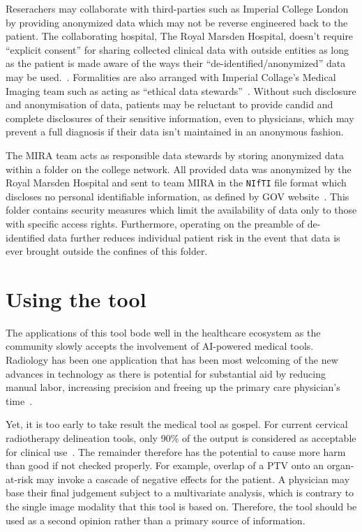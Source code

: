 \documentclass[12pt,twoside]{report}
\begin{document}
Reserachers may collaborate with third-parties such as Imperial College London by providing anonymized data which may not be reverse engineered back to the patient. The collaborating hospital, The Royal Marsden Hospital, doesn't require ``explicit consent'' for sharing collected clinical data with outside entities as long as the patient is made aware of the ways their ``de-identified/anonymized'' data may be used.~\cite{royal-marsden-privacy-note}. Formalities are also arranged with Imperial Collage's Medical Imaging team such as acting as ``ethical data stewards''~\cite{Larson2020-ib}. Without such disclosure and anonymisation of data, patients may be reluctant to provide candid and complete disclosures of their sensitive information, even to physicians, which may prevent a full diagnosis if their data isn't maintained in an anonymous fashion.

The MIRA team acts as responsible data stewards by storing anonymized data within a folder on the college network. All provided data was anonymized by the Royal Marsden Hospital and sent to team MIRA in the \texttt{NIfTI} file format which discloses no personal identifiable information, as defined by GOV website~\cite{gov-gdpr}. This folder contains security measures which limit the availability of data only to those with specific access rights. Furthermore, operating on the preamble of de-identified data further reduces individual patient risk in the event that data is ever brought outside the confines of this folder.

\section{Using the tool}\label{sect:using-the-tool}

The applications of this tool bode well in the healthcare ecosystem as the community slowly accepts the involvement of AI-powered medical tools. Radiology has been one application that has been most welcoming of the new advances in technology as there is potential for substantial aid by reducing manual labor, increasing precision and freeing up the primary care physician's time~\cite{Amisha2019-ki}.

Yet, it is too early to take result the medical tool as gospel. For current cervical radiotherapy delineation tools, only 90\% of the output is considered as acceptable for clinical use~\cite{LIU2020172}. The remainder therefore has the potential to cause more harm than good if not checked properly. For example, overlap of a PTV onto an organ-at-risk may invoke a cascade of negative effects for the patient. A physician may base their final judgement subject to a multivariate analysis, which is contrary to the single image modality that this tool is based on. Therefore, the tool should be used as a second opinion rather than a primary source of information.
\end{document}
